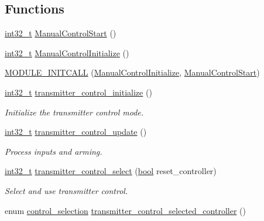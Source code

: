 \subsection*{Functions}
\begin{DoxyCompactItemize}
\item 
\hyperlink{group___n_a_m_e_gafd12020da5a235dfcf0c3c748fb5baed}{int32\-\_\-t} \hyperlink{group___control_module_ga6898605c577e556c14f9f296ce99d58a}{Manual\-Control\-Start} ()
\item 
\hyperlink{group___n_a_m_e_gafd12020da5a235dfcf0c3c748fb5baed}{int32\-\_\-t} \hyperlink{group___control_module_gab34729c98a8d9f36a6064c9148941005}{Manual\-Control\-Initialize} ()
\item 
\hyperlink{group___control_module_ga4a3722cc695788ccfc0e15d467e8f5a1}{M\-O\-D\-U\-L\-E\-\_\-\-I\-N\-I\-T\-C\-A\-L\-L} (\hyperlink{group___control_module_gab34729c98a8d9f36a6064c9148941005}{Manual\-Control\-Initialize}, \hyperlink{group___control_module_ga6898605c577e556c14f9f296ce99d58a}{Manual\-Control\-Start})
\item 
\hyperlink{group___n_a_m_e_gafd12020da5a235dfcf0c3c748fb5baed}{int32\-\_\-t} \hyperlink{group___control_module_ga27653bb9e2abe9498b31e9f748f158d8}{transmitter\-\_\-control\-\_\-initialize} ()
\begin{DoxyCompactList}\small\item\em Initialize the transmitter control mode. \end{DoxyCompactList}\item 
\hyperlink{group___n_a_m_e_gafd12020da5a235dfcf0c3c748fb5baed}{int32\-\_\-t} \hyperlink{group___control_module_gad28dba2f07e1f4fe872ccf01941c3c84}{transmitter\-\_\-control\-\_\-update} ()
\begin{DoxyCompactList}\small\item\em Process inputs and arming. \end{DoxyCompactList}\item 
\hyperlink{group___n_a_m_e_gafd12020da5a235dfcf0c3c748fb5baed}{int32\-\_\-t} \hyperlink{group___control_module_ga6ffb050d1f10ab7aa441ce65629e26bd}{transmitter\-\_\-control\-\_\-select} (\hyperlink{group___exported__types_gaf6a258d8f3ee5206d682d799316314b1}{bool} reset\-\_\-controller)
\begin{DoxyCompactList}\small\item\em Select and use transmitter control. \end{DoxyCompactList}\item 
enum \hyperlink{group___control_ga61438f5375f5e08187c7e12f13723afd}{control\-\_\-selection} \hyperlink{group___control_module_gacf816af6b4ab2c23707b55eb6b3281a0}{transmitter\-\_\-control\-\_\-selected\-\_\-controller} ()

\end{DoxyCompactItemize}
